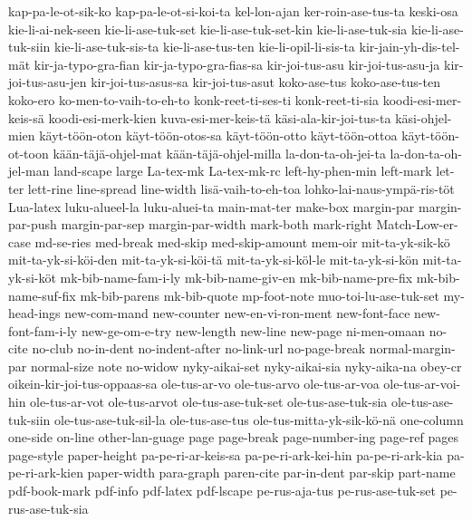 {  kap-pa-le-ot-sik-ko
  kap-pa-le-ot-si-koi-ta
  kel-lon-ajan
  ker-roin-ase-tus-ta
  keski-osa
  kie-li-ai-nek-seen
  kie-li-ase-tuk-set
  kie-li-ase-tuk-set-kin
  kie-li-ase-tuk-sia
  kie-li-ase-tuk-siin
  kie-li-ase-tuk-sis-ta
  kie-li-ase-tus-ten
  kie-li-opil-li-sis-ta
  kir-jain-yh-dis-tel-mät
  kir-ja-typo-gra-fian
  kir-ja-typo-gra-fias-sa
  kir-joi-tus-asu
  kir-joi-tus-asu-ja
  kir-joi-tus-asu-jen
  kir-joi-tus-asus-sa
  kir-joi-tus-asut
  koko-ase-tus
  koko-ase-tus-ten
  koko-ero
  ko-men-to-vaih-to-eh-to
  konk-reet-ti-ses-ti
  konk-reet-ti-sia
  koodi-esi-mer-keis-sä
  koodi-esi-merk-kien
  kuva-esi-mer-keis-tä
  käsi-ala-kir-joi-tus-ta
  käsi-ohjel-mien
  käyt-töön-oton
  käyt-töön-otos-sa
  käyt-töön-otto
  käyt-töön-ottoa
  käyt-töön-ot-toon
  kään-täjä-ohjel-mat
  kään-täjä-ohjel-milla
  la-don-ta-oh-jei-ta
  la-don-ta-oh-jel-man
  land-scape
  large
  La-tex-mk
  La-tex-mk-rc
  left-hy-phen-min
  left-mark
  let-ter
  lett-rine
  line-spread
  line-width
  lisä-vaih-to-eh-toa
  lohko-lai-naus-ympä-ris-töt
  Lua-latex
  luku-alueel-la
  luku-aluei-ta
  main-mat-ter
  make-box
  margin-par
  margin-par-push
  margin-par-sep
  margin-par-width
  mark-both
  mark-right
  Match-Low-er-case
  md-se-ries
  med-break
  med-skip
  med-skip-amount
  mem-oir
  mit-ta-yk-sik-kö
  mit-ta-yk-si-köi-den
  mit-ta-yk-si-köi-tä
  mit-ta-yk-si-köl-le
  mit-ta-yk-si-kön
  mit-ta-yk-si-köt
  mk-bib-name-fam-i-ly
  mk-bib-name-giv-en
  mk-bib-name-pre-fix
  mk-bib-name-suf-fix
  mk-bib-parens
  mk-bib-quote
  mp-foot-note
  muo-toi-lu-ase-tuk-set
  my-head-ings
  new-com-mand
  new-counter
  new-en-vi-ron-ment
  new-font-face
  new-font-fam-i-ly
  new-ge-om-e-try
  new-length
  new-line
  new-page
  ni-men-omaan
  no-cite
  no-club
  no-in-dent
  no-indent-after
  no-link-url
  no-page-break
  normal-margin-par
  normal-size
  note
  no-widow
  nyky-aikai-set
  nyky-aikai-sia
  nyky-aika-na
  obey-cr
  oikein-kir-joi-tus-oppaas-sa
  ole-tus-ar-vo
  ole-tus-arvo
  ole-tus-ar-voa
  ole-tus-ar-voi-hin
  ole-tus-ar-vot
  ole-tus-arvot
  ole-tus-ase-tuk-set
  ole-tus-ase-tuk-sia
  ole-tus-ase-tuk-siin
  ole-tus-ase-tuk-sil-la
  ole-tus-ase-tus
  ole-tus-mitta-yk-sik-kö-nä
  one-column
  one-side
  on-line
  other-lan-guage
  page
  page-break
  page-number-ing
  page-ref
  pages
  page-style
  paper-height
  pa-pe-ri-ar-keis-sa
  pa-pe-ri-ark-kei-hin
  pa-pe-ri-ark-kia
  pa-pe-ri-ark-kien
  paper-width
  para-graph
  paren-cite
  par-in-dent
  par-skip
  part-name
  pdf-book-mark
  pdf-info
  pdf-latex
  pdf-lscape
  pe-rus-aja-tus
  pe-rus-ase-tuk-set
  pe-rus-ase-tuk-sia
}
